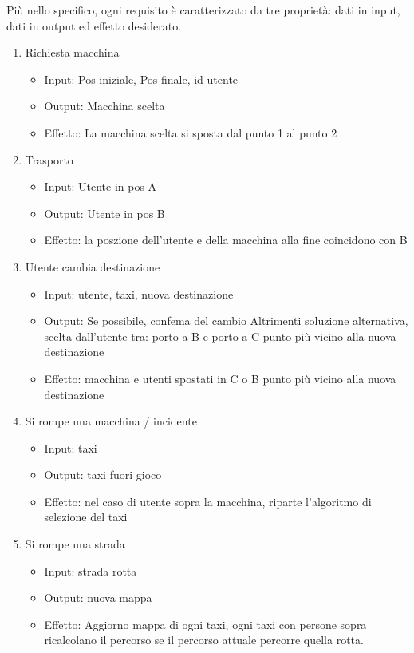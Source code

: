 Più nello specifico, ogni requisito è caratterizzato da tre proprietà: dati in input, dati in output ed effetto desiderato.

\begin{enumerate}
	\item Richiesta macchina
		\begin{itemize}
			\item Input:  Pos iniziale, Pos finale, id utente
			\item Output: Macchina scelta
			\item Effetto: La macchina scelta si sposta dal punto 1 al punto 2
		\end{itemize}

	\item Trasporto
		\begin{itemize}
			\item Input: Utente in pos A
			\item Output: Utente in pos B
			\item Effetto: la poszione dell'utente e della macchina alla fine coincidono con B
		\end{itemize}

	\item Utente cambia destinazione
		\begin{itemize}
			\item Input: utente, taxi, nuova destinazione
			\item Output: Se possibile, confema del cambio
			Altrimenti soluzione alternativa, scelta dall'utente tra: porto a B e porto a C punto più vicino alla nuova destinazione
			\item Effetto:  macchina e utenti spostati in C o B punto più vicino alla nuova destinazione
		\end{itemize}

	\item Si rompe una macchina / incidente
		\begin{itemize}
			\item Input: taxi
			\item Output: taxi fuori gioco
			\item Effetto: nel caso di utente sopra la macchina, riparte l'algoritmo di selezione del taxi
		\end{itemize}

	\item Si rompe una strada
		\begin{itemize}
			\item Input: strada rotta
			\item Output: nuova mappa
			\item Effetto: Aggiorno mappa di ogni taxi, ogni taxi con persone sopra ricalcolano il percorso se il percorso attuale percorre quella rotta.
		\end{itemize}

\end{enumerate}


